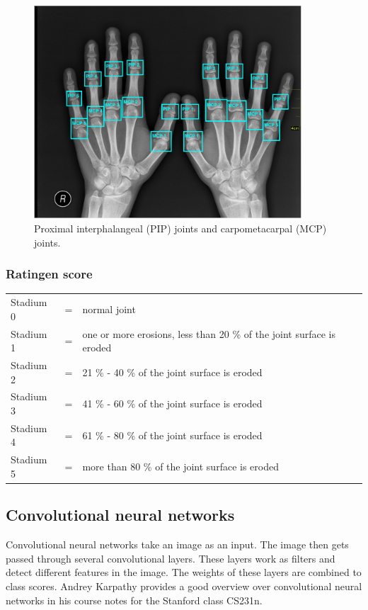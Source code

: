 \documentclass[12pt]{article}
\begin{document}
\begin{figure}[ht]
\includegraphics[width=10cm]{joints}	
\caption{Proximal interphalangeal (PIP) joints and carpometacarpal  (MCP) joints.}
\label{fig:joints}
\end{figure}


\subsubsection{Ratingen score}
\label{subsubsec:ratingen}


\begin{tabular}{ l c l }
  Stadium 0 & = & normal joint \\
  Stadium 1 & = & one or more erosions, less than 20 \% of the joint surface is eroded \\
  Stadium 2 & = & 21 \% - 40 \% of the joint surface is eroded \\
  Stadium 3 & = & 41 \% - 60 \% of the joint surface is eroded \\
  Stadium 4 & = & 61 \% - 80 \% of the joint surface is eroded \\
  Stadium 5 & = & more than 80 \% of the joint surface is eroded \\
\end{tabular}




\subsection{Convolutional neural networks}
\label{subsec:cnn}
Convolutional neural networks take an image as an input. The image then gets passed through several convolutional layers. These layers work as filters and detect different features in the image. The weights of these layers are combined to class scores. Andrey Karpathy provides a good overview over convolutional neural networks in his course notes for the Stanford class CS231n. \cite{cnn}
\end{document}
